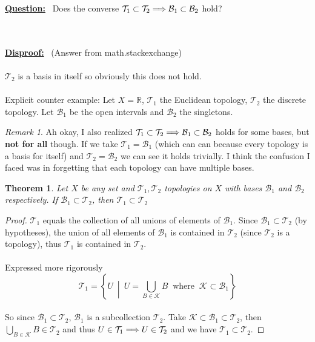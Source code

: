 \documentclass{article}
\newtheorem{theorem}{Theorem}[section]
\theoremstyle{remark}
\newtheorem*{remark}{Remark}
\theoremstyle{definition}
\newcommand{\simplies}{\DOTSB\Longrightarrow}
\begin{document}
\smallskip \begin{flushleft}
\textbf{\underline{Question:}} \ Does the converse $\mathcal{T}_1 \subset \mathcal{T}_2 \simplies \mathcal{B}_1 \subset \mathcal{B}_2$ hold?
\end{flushleft}
\\ \\
\textbf{\underline{Disproof:}} \ (Answer from math.stackexchange)\ \\ \\ $\mathcal{T}_2$ is a basis in itself so obviously this does not hold.
\\ \\
Explicit counter example: Let $X = \mathbb R$, $\mathcal{T}_1$ the Euclidean topology, $\mathcal{T}_2$ the discrete topology. Let $\mathcal{B}_1$ be the open intervals and $\mathcal B_2$ the singletons.
\medskip
\begin{remark}
Ah okay, I also realized $\mathcal{T}_1 \subset \mathcal{T}_2 \simplies \mathcal{B}_1 \subset \mathcal{B}_2$ holds for some bases, but \textbf{not for all} though. If we take $\mathcal{T}_1 = \mathcal{B}_1$ (which can can because every topology is a basis for itself) and $\mathcal{T}_2 = \mathcal{B}_2$ we can see it holds trivially. I think the confusion I faced was in forgetting that each topology can have multiple bases. 
\end{remark}

\hrulefill

\bigskip
\medskip

\begin{theorem}
Let $X$ be any set and $\mathcal{T}_1, \mathcal{T}_2$ topologies on $X$ with bases $\mathcal{B}_1$ and $\mathcal{B}_2$ respectively. If $\mathcal{B}_1 \subset \mathcal{T}_2$, then $\mathcal{T}_1 \subset \mathcal{T}_2$
\end{theorem}

\begin{proof}
$\mathcal{T}_1$ equals the collection of all unions of elements of $\mathcal{B}_1$. Since $\mathcal{B}_1 \subset \mathcal{T}_2$ (by hypotheses), the union of all elements of $\mathcal{B}_1$ is contained in $\mathcal{T}_2$ (since $\mathcal{T}_2$ is a topology), thus $\mathcal{T}_1$ is contained in $\mathcal{T}_2$. 
\\ \\
Expressed more rigorously $$\mathcal{T}_1 = \left\{U \ \middle| \ U = \bigcup_{B \in \mathcal{K}}B \ \text{ where } \ \mathcal{K} \subset \mathcal{B}_1\right\}$$
\\
So since  $\mathcal{B}_1 \subset \mathcal{T}_2$, $\mathcal{B}_1$ is a subcollection $\mathcal{T}_2$. Take $\mathcal{K} \subset \mathcal{B}_1 \subset \mathcal{T}_2$, then $\bigcup_{B \in \mathcal{K}}B \in \mathcal{T}_2$ and thus $U \in \mathcal{T}_1 \simplies U \in \mathcal{T}_2$ and we have $\mathcal{T}_1 \subset \mathcal{T}_2$.
\end{proof}
\end{document}
